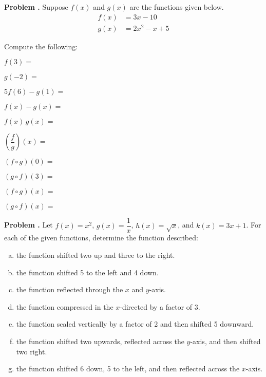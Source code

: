 \documentclass[11pt,letterpaper]{article}
\newcounter{problem}
\newcommand{\prob}{\stepcounter{problem}%
\noindent\textbf{Problem \theproblem. }}
\newenvironment{2enumerate}{%
	\begin{enumerate}[(a)]
	\begin{multicols}{2}
	}{%
	\end{multicols}
	\end{enumerate}
}
\newcommand{\pspace}{\par\vspace{\baselineskip}}
\begin{document}
\prob Suppose $f(x)$ and $g(x)$ are the functions given below. 
	\[
	\begin{aligned}
	f(x)&= 3x - 10 \\[0.3cm]
	g(x)&= 2x^2 - x + 5
	\end{aligned}
	\]

Compute the following: \pspace
\begin{2enumerate}
\item $f(3)=$ \vfill
\item $g(-2)=$ \vfill
\item $5f(6) - g(1)=$ \vfill
\item $f(x) - g(x)=$ \vfill
\item $f(x) \, g(x)=$ \vfill
\item $\left( \dfrac{f}{g} \right)(x)=$ \vfill
\item $(f \circ g)(0)=$ \vfill
\item $(g \circ f)(3)=$ \vfill
\item $(f \circ g)(x)=$ \vfill
\item $(g \circ f)(x)=$ \vfill
\end{2enumerate} \pspace



\prob Let $f(x)= x^2$, $g(x)= \dfrac{1}{x}$, $h(x)= \sqrt{x}$, and $k(x)= 3x + 1$. For each of the given functions, determine the function described:
	\begin{enumerate}[(a)]
	\item the function shifted two up and three to the right.
	\item the function shifted 5 to the left and 4 down.
	\item the function reflected through the $x$ and $y$-axis.
	\item the function compressed in the $x$-directed by a factor of 3.
	\item the function scaled vertically by a factor of 2 and then shifted 5 downward.
	\item the function shifted two upwards, reflected across the $y$-axis, and then shifted two right.
	\item the function shifted 6 down, 5 to the left, and then reflected across the $x$-axis.
	\end{enumerate} \pspace
\end{document}
